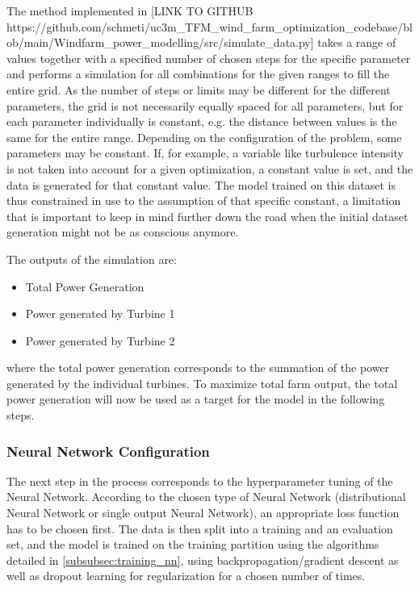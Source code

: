 The method implemented in [LINK TO GITHUB https://github.com/schmeti/uc3m_TFM_wind_farm_optimization_codebase/blob/main/Windfarm_power_modelling/src/simulate_data.py] takes a range of values together with a specified number of chosen steps for the specific parameter and performs a simulation for all combinations for the given ranges to fill the entire grid. As the number of steps or limits may be different for the different parameters, the grid is not necessarily equally spaced for all parameters, but for each parameter individually is constant, e.g. the distance between values is the same for the entire range.  
Depending on the configuration of the problem, some parameters may be constant. If, for example, a variable like turbulence intensity is not taken into account for a given optimization, a constant value is set, and the data is generated for that constant value. The model trained on this dataset is thus constrained in use to the assumption of that specific constant, a limitation that is important to keep in mind further down the road when the initial dataset generation might not be as conscious anymore. 

The outputs of the simulation are:
\begin{itemize}
	\item Total Power Generation
	\item Power generated by Turbine 1
	\item Power generated by Turbine 2
\end{itemize}

where the total power generation corresponds to the summation of the power generated by the individual turbines. To maximize total farm output, the total power generation will now be used as a target for the model in the following steps.

\subsubsection{Neural Network Configuration}

The next step in the process corresponds to the hyperparameter tuning of the Neural Network. According to the chosen type of Neural Network (distributional Neural Network or single output Neural Network), an appropriate loss function has to be chosen first. The data is then split into a training and an evaluation set, and the model is trained on the training partition using the algorithms detailed in  \ref{subsubsec:training_nn}, using backpropagation/gradient descent as well as dropout learning for regularization for a chosen number of times.  

